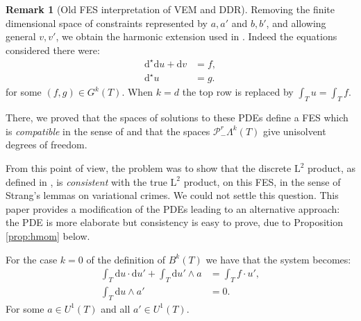 \documentclass[10pt,a4paper]{article}
\newcommand{\rmd}{\mathrm{d}}
\newcommand{\rmL}{\mathrm{L}}
\newcommand{\calP}{\mathcal{P}}
\newcommand{\Poly}{\calP}
\newcommand{\Pminus}{\Poly_{\!\!-}}
\theoremstyle{remark}
\theoremstyle{definition}
\newtheorem{remark}{Remark}[section]
\newcounter{quest}[exercise]
\numberwithin{equation}{section}
\begin{document}
\begin{remark}[Old FES interpretation of VEM and DDR]
Removing the finite dimensional space of constraints represented by $a,a'$ and $b,b'$, and allowing general $v,v'$, we obtain the harmonic extension used in \cite{ChrGil16}. Indeed the equations considered there were:
\begin{align}
  \rmd^\star \rmd u + \rmd v & = f,\\
  \rmd^\star u & = g.
\end{align}
for some $(f,g) \in G^k(T)$. When $k = d$ the top row is replaced by $\int_T u = \int_T f$.

There, we proved that the spaces of solutions to these PDEs define a FES which is \emph{compatible} in the sense of \cite[Definition 5.12]{ChrMunOwr11} and that the spaces $\Pminus^r \Lambda^k(T)$ give unisolvent degrees of freedom. 

From this point of view, the problem was to show that the discrete $\rmL^2$ product, as defined in \cite{DiPDroRap20,BonDiPDroHu25}, is \emph{consistent} with the true $\rmL^2$ product, on this FES, in the sense of Strang's lemmas on variational crimes. We could not settle this question. This paper provides a modification of the PDEs leading to an alternative approach: the PDE is more elaborate but consistency is easy to prove, due to Proposition \ref{prop:hmom} below. 
\end{remark}

For the case $k =0$ of the definition of $B^k(T)$ we have that the system becomes:
\begin{align}
  \int_T \rmd u \cdot \rmd u' + \int_T \rmd u' \wedge a & = \int_T f \cdot u',\\
  \int_T \rmd u \wedge a' & =0 .
\end{align}
For some $a \in U^1(T)$ and all $a' \in U^1(T)$.
\end{document}
